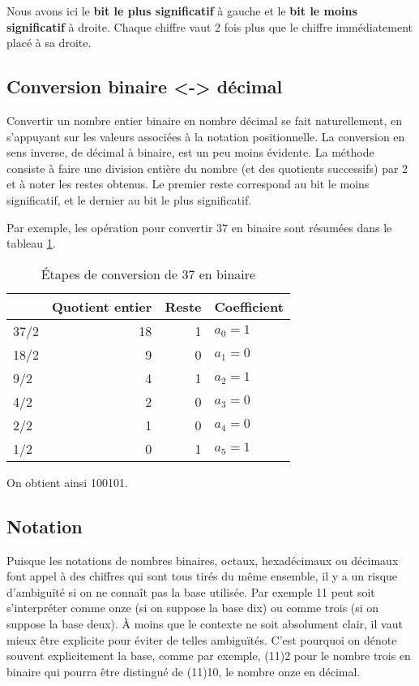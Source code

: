\documentclass[11pt]{article}
\begin{document}
Nous avons ici le \textbf{bit le plus significatif} à gauche et le \textbf{bit le
moins significatif} à droite. Chaque chiffre vaut 2 fois plus que le
chiffre immédiatement placé à sa droite.

\subsection{Conversion binaire <-> décimal}
\label{sec:orgf7e9f29}

Convertir un nombre entier binaire en nombre décimal se fait
naturellement, en s'appuyant sur les valeurs associées à la notation
positionnelle. La conversion en sens inverse, de décimal à binaire,
est un peu moins évidente. La méthode consiste à faire une division
entière du nombre (et des quotients successifs) par 2 et à noter les
restes obtenus. Le premier reste correspond au bit le moins
significatif, et le dernier au bit le plus significatif.

Par exemple, les opération pour convertir 37 en binaire sont résumées
dans le tableau \ref{tab:org0432619}.

\begin{table}[htbp]
\caption{\label{tab:org0432619}Étapes de conversion de 37 en binaire}
\centering
\begin{tabular}{lrrl}
 & Quotient entier & Reste & Coefficient\\
\hline
37/2 & 18 & 1 & \(a_0 = 1\)\\
18/2 & 9 & 0 & \(a_1 = 0\)\\
9/2 & 4 & 1 & \(a_2 = 1\)\\
4/2 & 2 & 0 & \(a_3 = 0\)\\
2/2 & 1 & 0 & \(a_4 = 0\)\\
1/2 & 0 & 1 & \(a_5 = 1\)\\
\end{tabular}
\end{table}

On obtient ainsi 100101.

\subsection{Notation}
\label{sec:orgfc0ae89}

Puisque les notations de nombres binaires, octaux, hexadécimaux ou
décimaux font appel à des chiffres qui sont tous tirés du même
ensemble, il y a un risque d’ambiguïté si on ne connaît pas la base
utilisée. Par exemple 11 peut soit s'interpréter comme onze (si on
suppose la base dix) ou comme trois (si on suppose la base deux). À
moins que le contexte ne soit absolument clair, il vaut mieux être
explicite pour éviter de telles ambiguïtés. C'est pourquoi on dénote
souvent explicitement la base, comme par exemple, (11)2 pour le nombre
trois en binaire qui pourra être distingué de (11)10, le nombre onze
en décimal.
\end{document}
